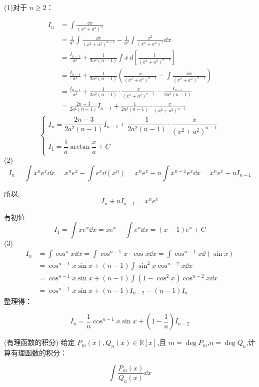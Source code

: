 \begin{solution}
	(1)对于 $n \geq 2$：
	
	\begin{align*}
		I_n &= \int \frac{\dd x}{(x^2 + a^2)^n} \\
		&= \frac{1}{a^2} \int \frac{\dd x}{(x^2 + a^2)^{n-1}} - \frac{1}{a^2} \int \frac{x^2}{(x^2 + a^2)^n} \dd x \\
		&= \frac{I_{n-1}}{a^2} + \frac{1}{2a^2(n-1)} \int x \, d\left[ \frac{1}{(x^2 + a^2)^{n-1}} \right] \\
		&= \frac{I_{n-1}}{a^2} + \frac{1}{2a^2(n-1)} \left( \frac{x}{(x^2 + a^2)^{n-1}} - \int \frac{\dd x}{(x^2 + a^2)^{n-1}} \right) \\
		&= \frac{I_{n-1}}{a^2} + \frac{1}{2a^2(n-1)} \cdot \frac{x}{(x^2 + a^2)^{n-1}} - \frac{I_{n-1}}{2a^2(n-1)} \\
		&= \frac{2n-3}{2a^2(n-1)} I_{n-1} + \frac{1}{2a^2(n-1)} \cdot \frac{x}{(x^2 + a^2)^{n-1}}
	\end{align*}
	\[\begin{cases}
		I_n= \dfrac{2n-3}{2a^2(n-1)} I_{n-1} + \dfrac{1}{2a^2(n-1)} \cdot \dfrac{x}{(x^2 + a^2)^{n-1}}\\
		I_1=\dfrac{1}{a}\arctan\dfrac{x}{a}+C
	\end{cases}\]
	(2)\[
	I_n = \int x^n e^x \dd x = x^n e^x - \int e^x \dd(x^n) = x^n e^x - n \int x^{n-1} e^x \dd x = x^n e^x - n I_{n-1}
	\]
	
	所以,
	\[
	I_n + n I_{n-1} = x^n e^x
	\]
	
	有初值
	\[
	I_1 = \int x e^x \dd x = x e^x - \int e^x \dd x = (x - 1)e^x + C
	\]
	(3)\[\begin{aligned}
		I_n &= \int \cos^n x \dd x = \int \cos^{n-1} x \cdot \cos x \dd x = \int \cos^{n-1} x \dd(\sin x)\\&= \cos^{n-1} x \sin x + (n-1) \int \sin^2 x \cos^{n-2} x \dd x\\&= \cos^{n-1} x \sin x + (n-1) \int (1 - \cos^2 x) \cos^{n-2} x \dd x\\&	= \cos^{n-1} x \sin x + (n-1) I_{n-2} - (n-1) I_n
	\end{aligned}\]
	整理得：
	
	\[
	I_n = \frac{1}{n} \cos^{n-1} x \sin x + \left(1 - \frac{1}{n}\right) I_{n-2}
	\]
\end{solution}
\begin{problem}(有理函数的积分)
	给定 $P_m(x), Q_n(x) \in \mathbb{R}[x]$,且 $m = \deg P_m$,$n = \deg Q_n$,计算有理函数的积分：
	
	\[
	\int \frac{P_m(x)}{Q_n(x)} \dd x
	\]
\end{problem}
